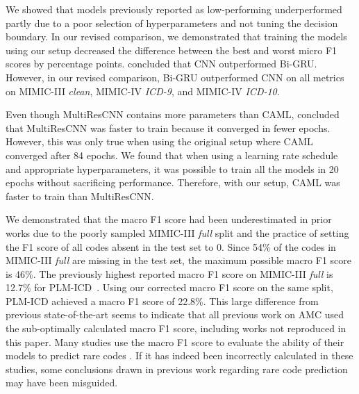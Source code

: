 \documentclass[anonymous=false, sigconf=true, review=false, natbib=true]{acmart}
\begin{document}
We showed that models previously reported as low-performing underperformed partly due to a poor selection of hyperparameters and not tuning the decision boundary. In our revised comparison, we demonstrated that training the models using our setup decreased the difference between the best and worst micro F1 scores by  percentage points. \citet{mullenbachExplainablePredictionMedical2018} concluded that CNN outperformed Bi-GRU. However, in our revised comparison, Bi-GRU outperformed CNN on all metrics on MIMIC-III \textit{clean}, MIMIC-IV \textit{ICD-9}, and MIMIC-IV \textit{ICD-10}.

Even though MultiResCNN contains more parameters than CAML, \citet{liICDCodingClinical2020} concluded that MultiResCNN was faster to train because it converged in fewer epochs. However, this was only true when using the original setup where CAML converged after 84 epochs. We found that when using a learning rate schedule and appropriate hyperparameters, it was possible to train all the models in 20 epochs without sacrificing performance. Therefore, with our setup, CAML was faster to train than MultiResCNN.

We demonstrated that the macro F1 score had been underestimated in prior works due to the poorly sampled MIMIC-III \textit{full} split and the practice of setting the F1 score of all codes absent in the test set to 0. Since 54\% of the codes in MIMIC-III \textit{full} are missing in the test set, the maximum possible macro F1 score is 46\%. The previously highest reported macro F1 score on MIMIC-III \textit{full} is 12.7\% for PLM-ICD~\cite{kimReadAttendCode2021}. Using our corrected macro F1 score on the same split, PLM-ICD achieved a macro F1 score of 22.8\%. This large difference from previous state-of-the-art seems to indicate that all previous work on AMC used the sub-optimally calculated macro F1 score, including works not reproduced in this paper. Many studies use the macro F1 score to evaluate the ability of their models to predict rare codes \cite{kimReadAttendCode2021, yuanCodeSynonymsMatter2022}. If it has indeed been incorrectly calculated in these studies, some conclusions drawn in previous work regarding rare code prediction may have been misguided.
\end{document}
